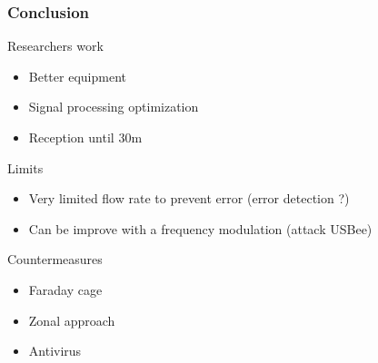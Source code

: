 \begin{frame}
\frametitle{Conclusion}
\begin{block}{Researchers work}
\begin{itemize}
\item Better equipment
\item Signal processing optimization
\item Reception until 30m
\end{itemize}
\end{block}
\begin{block}{Limits}
\begin{itemize}
\item Very limited flow rate to prevent error (error detection ?)
\item Can be improve with a frequency modulation (attack USBee)
\end{itemize}
\end{block}
\begin{block}{Countermeasures}
\begin{itemize}
\item Faraday cage
\item Zonal approach
\item Antivirus
\end{itemize}
\end{block}
\end{frame}